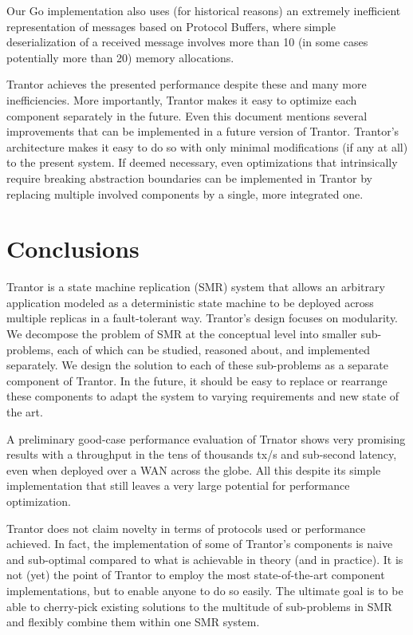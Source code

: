 \documentclass{article}
\begin{document}
Our Go implementation also uses (for historical reasons) an extremely inefficient representation of messages based on Protocol Buffers,
where simple deserialization of a received message involves more than 10 (in some cases potentially more than 20) memory allocations.

Trantor achieves the presented performance despite these and many more inefficiencies.
More importantly, Trantor makes it easy to optimize each component separately in the future.
Even this document mentions several improvements that can be implemented in a future version of Trantor.
Trantor's architecture makes it easy to do so with only minimal modifications (if any at all) to the present system.
If deemed necessary, even optimizations that intrinsically require breaking abstraction boundaries
can be implemented in Trantor by replacing multiple involved components by a single, more integrated one.

\section{Conclusions}
\label{sec:conclusions}

Trantor is a state machine replication (SMR) system that allows an arbitrary application modeled as a deterministic state machine
to be deployed across multiple replicas in a fault-tolerant way.
Trantor’s design focuses on modularity.
We decompose the problem of SMR at the conceptual level into smaller sub-problems, each of which can be studied, reasoned about, and implemented separately.
We design the solution to each of these sub-problems as a separate component of Trantor.
In the future, it should be easy to replace or rearrange these components to adapt the system to varying requirements and new state of the art.

A preliminary good-case performance evaluation of Trnator shows very promising results
with a throughput in the tens of thousands tx/s and sub-second latency,
even when deployed over a WAN across the globe.
All this despite its simple implementation that still leaves a very large potential for performance optimization.

Trantor does not claim novelty in terms of protocols used or performance achieved.
In fact, the implementation of some of Trantor’s components is naive and sub-optimal compared to what is achievable in theory (and in practice).
It is not (yet) the point of Trantor to employ the most state-of-the-art component implementations, but to enable anyone to do so easily.
The ultimate goal is to be able to cherry-pick existing solutions to the multitude of sub-problems in SMR and flexibly combine them within one SMR system.

\newpage



\end{document}
